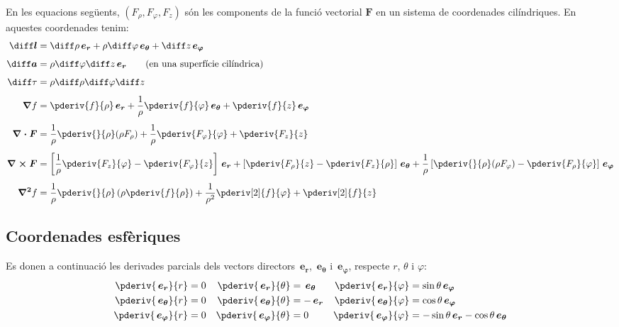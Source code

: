 \documentclass[catalan,a4paper,twoside,11pt]{article}
\begin{document}
En les equacions següents, $(F_\rho,F_\varphi,F_z)$  són les
components de la funció vectorial   $\boldsymbol{F}$ en un sistema de
coordenades cilíndriques. En aquestes coordenades tenim:
\begin{align}
    \boldsymbol{\diff l} &= \diff \rho \va + \rho\diff \varphi \vb + \diff z \vc\\[1ex]
    \boldsymbol{\diff a} &= \rho\diff \varphi \diff z \va\qquad\text{(en una superfície cilíndrica)}\\[1ex]
    \diff\tau &= \rho \diff \rho \diff \varphi \diff z\\[1ex]
    \boldsymbol{\nabla}f &= \pderiv{f}{\rho}\va + \frac{1}{\rho}\pderiv{f}{\varphi}\vb
    + \pderiv{f}{z}\vc\\[1ex]
    \boldsymbol{\nabla\cdot F} &= \frac{1}{\rho}\pderiv{}{\rho}(\rho F_\rho) +
    \frac{1}{\rho}\pderiv{F_\varphi}{\varphi}+ \pderiv{F_z}{z}\\[1ex]
    \boldsymbol{\nabla\times F} &= \left[\frac{1}{\rho}\pderiv{F_z}{\varphi}-
    \pderiv{F_\varphi}{z}\right]\va +
    \left[\pderiv{F_\rho}{z}-\pderiv{F_z}{\rho}\right]\vb +
    \frac{1}{\rho}\left[\pderiv{}{\rho}(\rho F_\varphi)-\pderiv{F_\rho}{\varphi}\right]\vc\\[1ex]
    \boldsymbol{\nabla^2}f &= \frac{1}{\rho}\pderiv{}{\rho}\left(\rho\pderiv{f}{\rho}
    \right)
    + \frac{1}{\rho^2}\pderiv[2]{f}{\varphi}+ \pderiv[2]{f}{z}
\end{align}


\subsection{Coordenades esfèriques}

\renewcommand{\va}{\ensuremath{\,\boldsymbol{e_r}}}
\renewcommand{\vb}{\ensuremath{\,\boldsymbol{e_\theta}}}
\renewcommand{\vc}{\ensuremath{\,\boldsymbol{e_\varphi}}}

Es donen a continuació les derivades parcials dels vectors directors $\va$, $\vb$ i $\vc$, respecte  $r$, $\theta$ i $\varphi$:
\begin{subequations}
\begin{align}
   \pderiv{\va}{r} &= 0 & \pderiv{\va}{\theta} &= \vb  & \pderiv{\va}{\varphi} &= \sin\theta\vc \\
   \pderiv{\vb}{r} &= 0 & \pderiv{\vb}{\theta} &= -\va & \pderiv{\vb}{\varphi} &= \cos\theta\vc \\
   \pderiv{\vc}{r} &= 0 & \pderiv{\vc}{\theta} &= 0    & \pderiv{\vc}{\varphi} &= -\sin\theta\va-\cos\theta\vb
\end{align}
\end{subequations}
\end{document}
